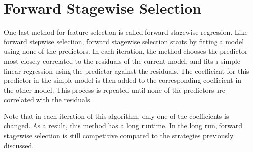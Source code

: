 \documentclass{article}
\begin{document}
\section{Forward Stagewise Selection}
One last method for feature selection is called forward stagewise regression. Like forward stepwise selection, forward stagewise selection starts by fitting a model using none of the predictors. In each iteration, the method chooses the predictor most closely correlated to the residuals of the current model, and fits a simple linear regression using the predictor against the residuals. The coefficient for this predictor in the simple model is then added to the corresponding coefficient in the other model. This process is repeated until none of the predictors are correlated with the residuals.

Note that in each iteration of this algorithm, only one of the coefficients is changed. As a result, this method has a long runtime. In the long run, forward stagewise selection is still competitive compared to the strategies previously discussed.



\end{document}
